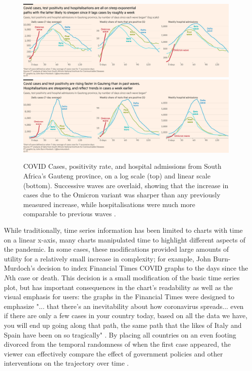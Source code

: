 \documentclass[article]{jdssv}\usepackage[]{graphicx}\usepackage[]{color}
\begin{document}
\begin{figure}\centering
\includegraphics[width=\linewidth]{ft-waves}\\
\includegraphics[width=\linewidth]{ft-waves-linear}
\caption{COVID Cases, positivity rate, and hospital admissions from South Africa's Gauteng province, on a log scale (top) and linear scale (bottom). Successive waves are overlaid, showing that the increase in cases due to the Omicron variant was sharper than any previously measured increase, while hospitalisations were much more comparable to previous waves \citep{burn-murdoch_new_2021-1}.}
\label{fig:ft-waves}
\end{figure}

While traditionally, time series information has been limited to charts with time on a linear x-axis, many charts manipulated time to highlight different aspects of the pandemic. In some cases, these modifications provided large amounts of utility for a relatively small increase in complexity; for example, John Burn-Murdoch's decision to index Financial Times COVID graphs to the days since the $N$th case or death. This decision is a small modification of the basic time series plot, but has important consequences in the chart's readability as well as the visual emphasis for users: the graphs in the Financial Times were designed to emphasize "... that there's an inevitability about how coronavirus spreads... even if there are only a few cases in your country today, based on all the data we have, you will end up going along that path, the same path that the likes of Italy and Spain have been on so tragically" \citep{hannenCoronavirusTrajectoryTracker2020a}. By placing all countries on an even footing divorced from the temporal randomness of when the first case appeared, the viewer can effectively compare the effect of government policies and other interventions on the trajectory over time \citep{burn-murdochAllCountriesDeath2020,burn-murdochLatestCaseTrajectories2020}. 
\end{document}
